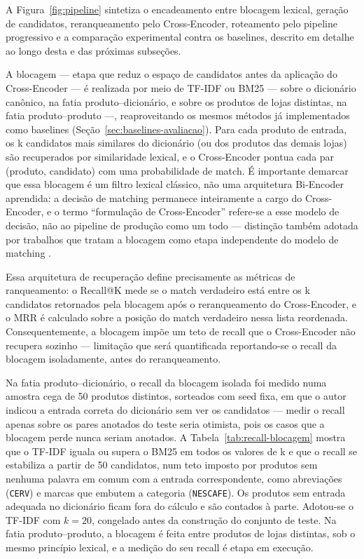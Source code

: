 \documentclass[
    article,
    12pt,
    oneside,
    a4paper,
    english,
    brazilian
    ]{abntex2}
\numberwithin{equation}{section}
\begin{document}
A Figura~\ref{fig:pipeline} sintetiza o encadeamento entre blocagem lexical, geração de candidatos, reranqueamento pelo Cross-Encoder, roteamento pelo pipeline progressivo e a comparação experimental contra os baselines, descrito em detalhe ao longo desta e das próximas subseções.



A blocagem --- etapa que reduz o espaço de candidatos antes da aplicação do Cross-Encoder --- é realizada por meio de TF-IDF ou BM25 --- sobre o dicionário canônico, na fatia produto--dicionário, e sobre os produtos de lojas distintas, na fatia produto--produto ---, reaproveitando os mesmos métodos já implementados como baselines (Seção~\ref{sec:baselines-avaliacao}). Para cada produto de entrada, os k candidatos mais similares do dicionário (ou dos produtos das demais lojas) são recuperados por similaridade lexical, e o Cross-Encoder pontua cada par (produto, candidato) com uma probabilidade de match. É importante demarcar que essa blocagem é um filtro lexical clássico, não uma arquitetura Bi-Encoder aprendida: a decisão de matching permanece inteiramente a cargo do Cross-Encoder, e o termo ``formulação de Cross-Encoder'' refere-se a esse modelo de decisão, não ao pipeline de produção como um todo --- distinção também adotada por trabalhos que tratam a blocagem como etapa independente do modelo de matching \cite{thirumuruganathan2021}.

Essa arquitetura de recuperação define precisamente as métricas de ranqueamento: o Recall@K mede se o match verdadeiro está entre os k candidatos retornados pela blocagem após o reranqueamento do Cross-Encoder, e o MRR é calculado sobre a posição do match verdadeiro nessa lista reordenada. Consequentemente, a blocagem impõe um teto de recall que o Cross-Encoder não recupera sozinho --- limitação que será quantificada reportando-se o recall da blocagem isoladamente, antes do reranqueamento.

Na fatia produto--dicionário, o recall da blocagem isolada foi medido numa amostra cega de 50 produtos distintos, sorteados com seed fixa, em que o autor indicou a entrada correta do dicionário sem ver os candidatos --- medir o recall apenas sobre os pares anotados do teste seria otimista, pois os casos que a blocagem perde nunca seriam anotados. A Tabela~\ref{tab:recall-blocagem} mostra que o TF-IDF iguala ou supera o BM25 em todos os valores de k e que o recall se estabiliza a partir de 50 candidatos, num teto imposto por produtos sem nenhuma palavra em comum com a entrada correspondente, como abreviações (\texttt{CERV}) e marcas que embutem a categoria (\texttt{NESCAFE}). Os produtos sem entrada adequada no dicionário ficam fora do cálculo e são contados à parte. Adotou-se o TF-IDF com $k=20$, congelado antes da construção do conjunto de teste. Na fatia produto--produto, a blocagem é feita entre produtos de lojas distintas, sob o mesmo princípio lexical, e a medição do seu recall é etapa em execução.
\end{document}
